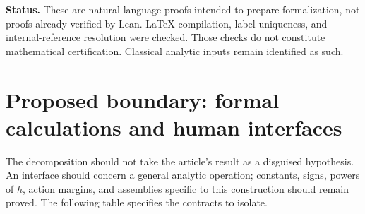 \documentclass[11pt,a4paper]{article}
\begin{document}
\textbf{Status.} These are natural-language proofs intended to prepare
formalization, not proofs already verified by Lean. \LaTeX{} compilation,
label uniqueness, and internal-reference resolution were checked. Those
checks do not constitute mathematical certification. Classical analytic inputs
remain identified as such.

\section{Proposed boundary: formal calculations and human interfaces}
The decomposition should not take the article's result as a disguised
hypothesis. An interface should concern a general analytic operation;
constants, signs, powers of $h$, action margins, and assemblies specific to this
construction should remain proved. The following table specifies the contracts
to isolate.
\end{document}

